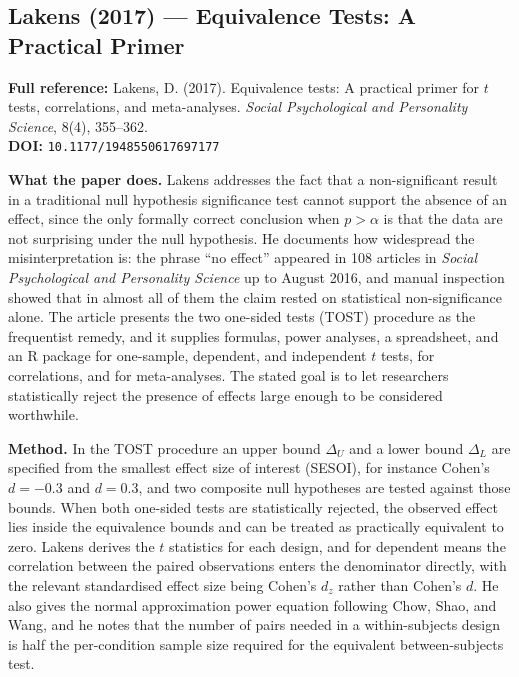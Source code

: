 \documentclass[11pt, a4paper]{article}
\begin{document}
\subsection{Lakens (2017) --- Equivalence Tests: A Practical Primer}

\begin{refbox}
\textbf{Full reference:} Lakens, D. (2017). Equivalence tests: A practical primer for $t$ tests, correlations, and meta-analyses. \emph{Social Psychological and Personality Science}, 8(4), 355--362.\\
\textbf{DOI:} \texttt{10.1177/1948550617697177}
\end{refbox}

\textbf{What the paper does.} Lakens addresses the fact that a non-significant result in a traditional null hypothesis significance test cannot support the absence of an effect, since the only formally correct conclusion when $p > \alpha$ is that the data are not surprising under the null hypothesis. He documents how widespread the misinterpretation is: the phrase ``no effect'' appeared in 108 articles in \emph{Social Psychological and Personality Science} up to August 2016, and manual inspection showed that in almost all of them the claim rested on statistical non-significance alone. The article presents the two one-sided tests (TOST) procedure as the frequentist remedy, and it supplies formulas, power analyses, a spreadsheet, and an R package for one-sample, dependent, and independent $t$ tests, for correlations, and for meta-analyses. The stated goal is to let researchers statistically reject the presence of effects large enough to be considered worthwhile.

\textbf{Method.} In the TOST procedure an upper bound $\Delta_U$ and a lower bound $\Delta_L$ are specified from the smallest effect size of interest (SESOI), for instance Cohen's $d = -0.3$ and $d = 0.3$, and two composite null hypotheses are tested against those bounds. When both one-sided tests are statistically rejected, the observed effect lies inside the equivalence bounds and can be treated as practically equivalent to zero. Lakens derives the $t$ statistics for each design, and for dependent means the correlation between the paired observations enters the denominator directly, with the relevant standardised effect size being Cohen's $d_z$ rather than Cohen's $d$. He also gives the normal approximation power equation following Chow, Shao, and Wang, and he notes that the number of pairs needed in a within-subjects design is half the per-condition sample size required for the equivalent between-subjects test.
\end{document}
